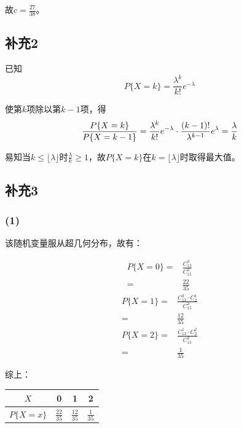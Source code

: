 \documentclass[a4paper,12pt]{ctexart}
\begin{document}
故$c = \frac{27}{38}$。

\subsection*{补充2}

已知
\begin{equation*}
	P\{X = k\} = \frac{\lambda^k}{k!} e^{-\lambda}
\end{equation*}

使第$k$项除以第$k-1$项，得
\begin{equation*}
	\frac{P\{X = k\}}{P\{X = k - 1\}} = \frac{\lambda^k}{k!} e^{-\lambda} \cdot \frac{(k - 1)!}{\lambda^{k - 1}} e^{\lambda} = \frac{\lambda}{k}\\
\end{equation*}

易知当$k \leq \lfloor \lambda \rfloor$时$\frac{\lambda}{k} \geq 1$，故$P\{X = k\}$在$k = \lfloor \lambda \rfloor$时取得最大值。

\subsection*{补充3}

\subsubsection*{(1)}

该随机变量服从超几何分布，故有：

\begin{align*}
	P\{X = 0\} =& \frac{C_{13}^3}{C_{15}^3}\\
	=& \frac{22}{35}
\end{align*}
\begin{align*}
	P\{X = 1\} =& \frac{C_{13}^2 \cdot C_2^1}{C_{15}^3}\\
	=& \frac{12}{35}
\end{align*}
\begin{align*}
	P\{X = 2\} =& \frac{C_{13}^1 \cdot C_2^2}{C_{15}^3}\\
	=& \frac{1}{35}
\end{align*}

综上：

\begin{center}
	\begin{tabular}{cccc}
		\toprule
		$X$ & 0 & 1 & 2 \\
		\midrule
		$P\{X = x\}$ & $\frac{22}{35}$ & $\frac{12}{35}$ & $\frac{1}{35}$ \\
		\bottomrule
	\end{tabular}
\end{center}
\end{document}
